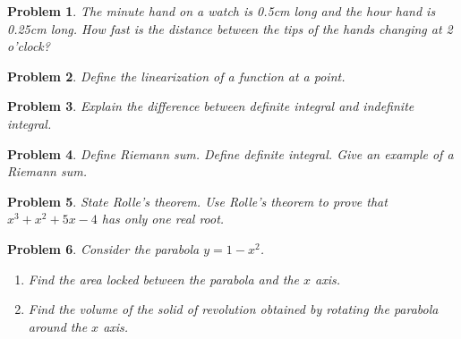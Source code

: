 \documentclass{article}
\newtheorem{problem}{Problem}
\begin{document}
\begin{problem}
The minute hand on a watch is 0.5cm long and the hour hand is 0.25cm long. How fast is the distance between the tips of the hands changing at 2 o'clock?
\end{problem}

\begin{problem}Define the linearization of a function at a point.
\end{problem}

\begin{problem}
Explain the difference between definite integral and indefinite integral.
\end{problem}

\begin{problem}
Define Riemann sum. Define definite integral. Give an example of a Riemann sum.
\end{problem}

\begin{problem}
State Rolle's theorem. Use Rolle's theorem to prove that $x^3 +x^2+ 5x- 4$ has only one real root.
\end{problem}

\begin{problem}
Consider the parabola $y=1-x^2$.
\begin{enumerate}
\item Find the area locked between the parabola and the $x$ axis.
\item Find the volume of the solid of revolution obtained by rotating the parabola around the $x$ axis.
\end{enumerate}
\end{problem}
\end{document}
